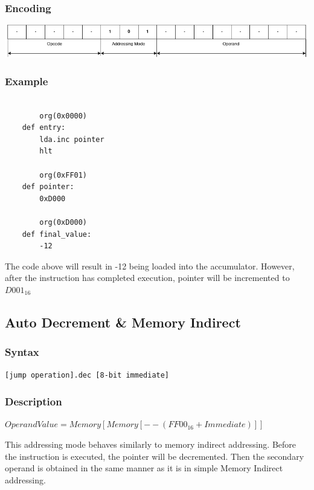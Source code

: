 \subsubsection{Encoding}
\begin{center}
    \includegraphics[scale=0.40]{img/Andromeda-INC.drawio}
\end{center}

\subsubsection{Example}
\begin{verbatim}

        org(0x0000)
    def entry:
        lda.inc pointer
        hlt

        org(0xFF01)
    def pointer:
        0xD000

        org(0xD000)
    def final_value:
        -12

\end{verbatim}
The code above will result in -12 being loaded into the accumulator.
However, after the instruction has completed execution, pointer will be incremented to $D001_{16}$
\pagebreak

\subsection{Auto Decrement \& Memory Indirect}\label{subsec:auto-decrement-&-memory-indirect-(dec)}
\subsubsection{Syntax}
\begin{verbatim}[jump operation].dec [8-bit immediate]\end{verbatim}

\subsubsection{Description}
$OperandValue = Memory[Memory[--(FF00_{16} + Immediate)]]$
\par This addressing mode behaves similarly to memory indirect addressing.
Before the instruction is executed, the pointer will be decremented.
Then the secondary operand is obtained in the same manner as it is in simple Memory Indirect addressing.


